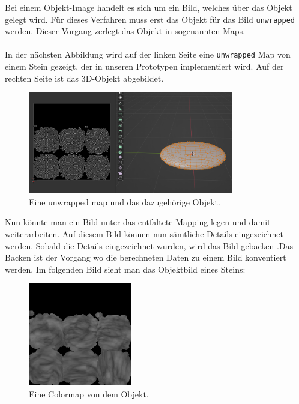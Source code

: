 Bei einem Objekt-Image handelt es sich um ein Bild, welches über das Objekt gelegt wird. Für dieses Verfahren muss erst das Objekt für das Bild \verb+unwrapped+ werden. Dieser Vorgang zerlegt das Objekt in sogenannten Maps.\\\\
In der nächsten Abbildung wird auf der linken Seite eine \verb+unwrapped+ Map von einem Stein gezeigt, der in unseren Prototypen implementiert wird. Auf der rechten Seite ist das 3D-Objekt abgebildet.


\begin{figure}[H]
    \centering
    \includegraphics[width=0.8\textwidth]{chapters/11/Images/StoneAndUnwrap.png}
    \caption{Eine unwrapped map und das dazugehörige Objekt.}
    \label{htl01}
\end{figure}

\noindent Nun könnte man ein Bild unter das entfaltete Mapping legen und damit weiterarbeiten. Auf diesem Bild können nun sämtliche Details eingezeichnet werden. Sobald die Details eingezeichnet wurden, wird das Bild \glqq gebacken \grqq.Das Backen ist der Vorgang wo die berechneten Daten zu einem Bild konventiert werden. Im folgenden Bild sieht man das Objektbild eines Steins: 

\begin{figure}[H]
    \centering
    \includegraphics[width=0.4\textwidth]{chapters/11/Images/SteinColor.png}
    \caption{Eine Colormap von dem Objekt.}
    \label{htl01}
\end{figure}

